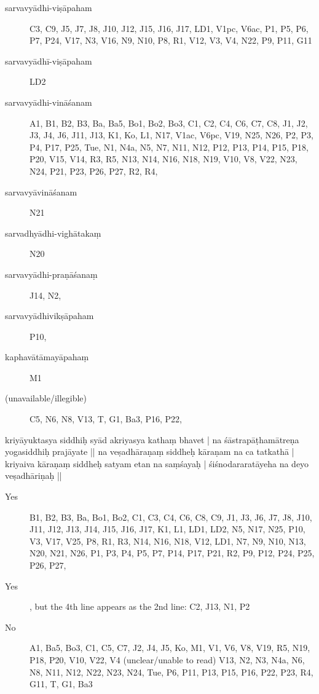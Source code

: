 \begin{ekdosis}
      
\begin{marma}[hp01_054]
  \begin{description}
  \item[sarvavyādhi-viṣāpaham] C3, C9, J5, J7, J8, J10, J12, J15, J16, J17, LD1, V1pc, V6ac, P1, P5, P6, P7, P24, V17, N3, V16, N9, N10, P8, R1, V12, V3, V4, N22, P9, P11, G11
  \item[sarvavyādhī-viṣāpaham] LD2
  \item[sarvavyādhi-vināśanam] A1, B1, B2, B3, Ba, Ba5, Bo1, Bo2, Bo3, C1, C2, C4, C6, C7, C8, J1, J2, J3, J4, J6, J11, J13, K1, Ko, L1, N17, V1ac, V6pc, V19, N25, N26, P2, P3, P4, P17, P25, Tue, N1, N4a, N5, N7, N11, N12, P12, P13, P14, P15, P18, P20, V15, V14, R3, R5, N13, N14, N16, N18, N19, V10, V8, V22, N23, N24, P21, P23, P26, P27, R2, R4, 
\item[sarvavyāvināśanam]   N21
\item[sarvadhyādhi-vighātakaṃ]   N20
\item[sarvavyādhi-praṇāśanaṃ]    J14, N2, 
  \item[sarvavyādhivikṣāpaham] P10, 
\item[kaphavātāmayāpahaṃ]    M1
\item[(unavailable/illegible)]    C5, N6, N8, V13, T, G1, Ba3, P16, P22,
    \end{description}
 \end{marma}


      
\begin{marma}[hp01_055]
 
kriyāyuktasya siddhiḥ syād akriyasya kathaṃ bhavet |
na śāstrapāṭhamātreṇa yogasiddhiḥ prajāyate ||
na veṣadhāraṇaṃ siddheḥ kāraṇam na ca tatkathā |
kriyaiva kāraṇaṃ siddheḥ satyam etan na saṃśayaḥ |
śiśnodararatāyeha na deyo veṣadhāriṇaḥ ||

\begin{description}
\item[Yes] B1, B2, B3, Ba, Bo1, Bo2, C1, C3, C4, C6, C8, C9, J1, J3, J6, J7, J8, J10, J11, J12, J13, J14, J15, J16, J17, K1, L1, LD1, LD2, N5, N17, N25, P10, V3, V17, V25, P8, R1, R3, N14, N16, N18, V12, LD1, N7, N9, N10, N13, N20, N21, N26, P1, P3, P4, P5, P7, P14, P17, P21, R2, P9, P12, P24, P25, P26, P27, 
\item[Yes], but the 4th line appears as the 2nd line: C2, J13, N1, P2
\item[No] A1, Ba5, Bo3, C1, C5, C7, J2, J4, J5, Ko, M1, V1, V6, V8, V19, R5, N19, P18, P20, V10, V22, V4 (unclear/unable to read) V13, N2, N3, N4a, N6, N8, N11, N12, N22, N23, N24, Tue, P6, P11, P13, P15, P16, P22, P23, R4, G11, T, G1, Ba3
    \end{description}


\end{marma}
\end{ekdosis}
